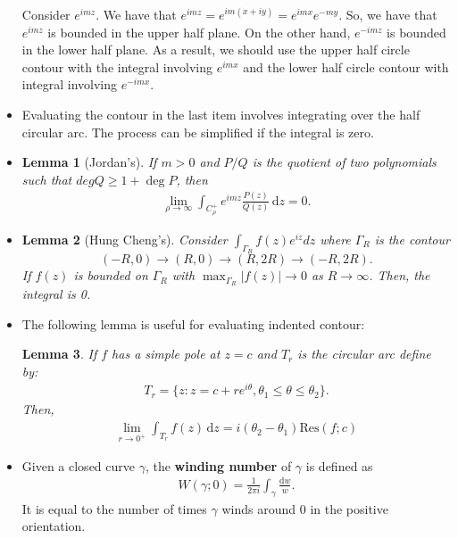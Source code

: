 \documentclass[10pt]{article}
\newtheorem{lemma}{Lemma}[section]
\newcommand{\dee}{\mathrm{d}}
\newcommand{\ra}{\rightarrow}
\newcommand{\Res}{\mathrm{Res}}
\begin{document}
\begin{itemize}
    Consider $e^{imz}$. We have that $e^{imz} = e^{im(x+iy)} = e^{imx} e^{-my}$. So, we have that $e^{imz}$ is bounded in the upper half plane. On the other hand, $e^{-imz}$ is bounded in the lower half plane. As a result, we should use the upper half circle contour with the integral involving $e^{imx}$ and the lower half circle contour with integral involving $e^{-imx}$.

    \item Evaluating the contour in the last item involves integrating over the half circular arc. The process can be simplified if the integral is zero.

    \item \begin{lemma}[Jordan's]
      If $m > 0$ and $P/Q$ is the quotient of two polynomials such that $deg Q \geq 1 + \deg P$, then
      \begin{align*}
        \lim_{\rho \ra \infty} \int_{C^+_\rho} e^{imz} \frac{P(z)}{Q(z)}\, \dee z = 0.
      \end{align*}
    \end{lemma}

    \item \begin{lemma}[Hung Cheng's]
      Consider $\int_{\Gamma_R} f(z) e^{iz} dz$ where $\Gamma_R$ is the contour $$(-R, 0) \ra (R,0) \ra (R, 2R) \ra (-R, 2R).$$ If $f(z)$ is bounded on $\Gamma_R$ with $\max_{\Gamma_R} |f(z)| \ra 0$ as $R \ra \infty$. Then, the integral is 0.
    \end{lemma}

    \item The following lemma is useful for evaluating indented contour:

    \begin{lemma}
      If $f$ has a simple pole at $z = c$ and $T_r$ is the circular arc define by:
    \begin{align*}
      T_r = \{z : z = c +re^{i\theta}, \theta_1 \leq \theta \leq \theta_2 \}.
    \end{align*}
    Then,
    \begin{align*}
      \lim_{r \ra 0^+} \int_{T_r} f(z)\, \dee z = i(\theta_2 - \theta_1) \Res(f;c)
    \end{align*}
    \end{lemma}

    \item Given a closed curve $\gamma$, the {\bf winding number} of $\gamma$ is defined as
    \begin{align*}
      W(\gamma;0) = \frac{1}{2\pi i} \int_{\gamma} \frac{\dee w}{w}.
    \end{align*}
    It is equal to the number of times $\gamma$ winds around $0$ in the positive orientation.


\end{itemize}
\end{document}
